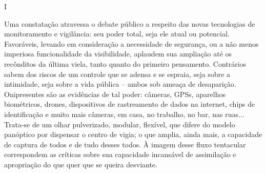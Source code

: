 \begin{center}
I
\end{center}

Uma constatação atravessa o debate público a respeito das novas
tecnologias de monitoramento e vigilância: seu poder total, seja ele
atual ou potencial. Favoráveis, levando em consideração a necessidade de
segurança, ou a não menos imperiosa funcionalidade da visibilidade,
aplaudem sua ampliação até os recônditos da última viela, tanto quanto
do primeiro pensamento. Contrários sabem dos riscos de um controle que
se adensa e se espraia, seja sobre a intimidade, seja sobre a vida
pública -- ambos sob ameaça de desaparição. Onipresentes são as
evidências de tal poder: câmeras, GPSs, aparelhos biométricos, drones,
dispositivos de rastreamento de dados na internet, chips de
identificação e muito mais câmeras, em casa, no trabalho, no bar, nas
ruas... Trata-se de um olhar pulverizado, modular, flexível, que difere
do modelo panóptico por dispensar o centro de vigia; o que amplia, ainda
mais, a capacidade de captura de todos e de tudo desses todos. À imagem
desse fluxo tentacular correspondem as críticas sobre sua capacidade
incansável de assimilação e apropriação do que quer que se queira
desviante.

